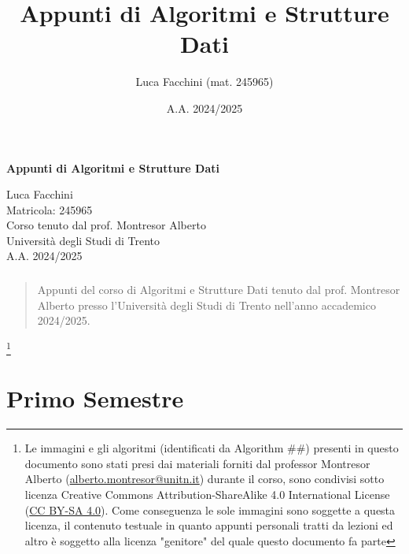 \documentclass[a4paper,twoside]{book}
\title{Appunti di Algoritmi e Strutture Dati}
\author{Luca Facchini (mat. 245965)}
\date{A.A. 2024/2025}
\makeatletter
\newenvironment{abstract}{%
    \if@twocolumn
        \section*{\abstractname}%
    \else
        \begin{center}%
            {\bfseries \abstractname\vspace{-.5em}\vspace{\z@}}%
        \end{center}%
        \small
        \begin{quotation}
    \fi}
    {\if@twocolumn\else\end{quotation}\fi}
\theoremstyle{definition}
\makeatother
\begin{document}
    \begin{titlepage}
        \centering  %
        {\Huge\textbf{Appunti di Algoritmi e Strutture Dati}} \\[1cm] %
        \vspace{0.5cm}
        
        {\Large Luca Facchini} \\ %
        \vspace{0.3cm}
        {\large Matricola: 245965} \\[2cm] %
        
        {\large Corso tenuto dal prof. Montresor Alberto} \\[0.3cm] %
        {\large Università degli Studi di Trento} \\[1.5cm]
        
        {\large A.A. 2024/2025} \\[3cm] %
        
        \vfill
        \begin{abstract}
            Appunti del corso di Algoritmi e Strutture Dati tenuto dal prof. Montresor Alberto presso l'Università degli Studi di Trento nell'anno accademico 2024/2025.
        \end{abstract}
        \footnote{Le immagini e gli algoritmi (identificati da Algorithm \#\#) presenti in questo documento sono stati presi dai materiali forniti dal professor Montresor Alberto (\href{mailto:alberto.montresor@unitn.it}{alberto.montresor@unitn.it}) durante il corso, sono condivisi sotto licenza Creative Commons Attribution-ShareAlike 4.0 International License (\href{https://creativecommons.org/licenses/by-sa/4.0/}{CC BY-SA 4.0}). Come conseguenza le sole immagini sono soggette a questa licenza, il contenuto testuale in quanto appunti personali tratti da lezioni ed altro è soggetto alla licenza "genitore" del quale questo documento fa parte}
        
        \vfill  %
    \end{titlepage}
    \newpage
    \pagestyle{tocStyle}
    \renewcommand{\headheight}{14.5pt}
    \begingroup
        \tableofcontents
        \thispagestyle{tocStyle}
    \endgroup
    \newpage
    \pagestyle{stdPage}
    \part{Primo Semestre}
    
    
    
    
    
    
    
    
    
\end{document}
